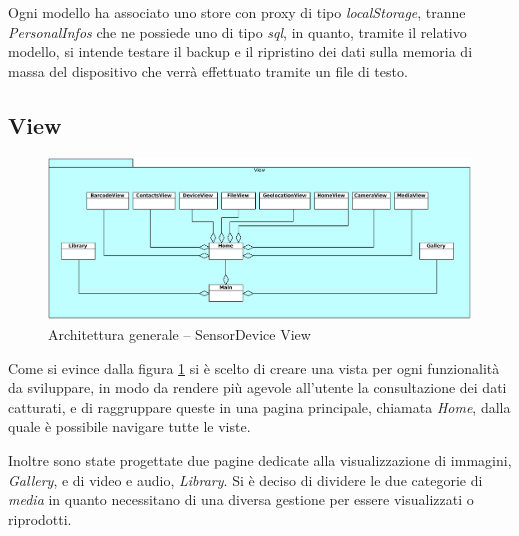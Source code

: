 Ogni modello ha associato uno store con proxy di tipo \emph{localStorage}, tranne \emph{PersonalInfos} che ne possiede uno di tipo \emph{sql}, in quanto, tramite il relativo modello, si intende testare il backup e il ripristino dei dati sulla memoria di massa del dispositivo che verrà effettuato tramite un file di testo.

\subsection{View}
\begin{figure}[htb]
\centering
\includegraphics[scale=0.45]{gfx/class/SensorDevice_View.pdf}
\caption{Architettura generale -- SensorDevice View}
\label{fig:architettura SensorDevice View}
\end{figure}
Come si evince dalla figura \ref{fig:architettura SensorDevice View} si è scelto di creare una vista per ogni funzionalità da sviluppare, in modo da rendere più agevole all'utente la consultazione dei dati catturati, e di raggruppare queste in una pagina principale, chiamata \emph{Home}, dalla quale è possibile navigare tutte le viste.

Inoltre sono state progettate due pagine dedicate alla visualizzazione di immagini, \emph{Gallery}, e di video e audio, \emph{Library}.
Si è deciso di dividere le due categorie di \emph{media} in quanto necessitano di una diversa gestione per essere visualizzati o riprodotti.


